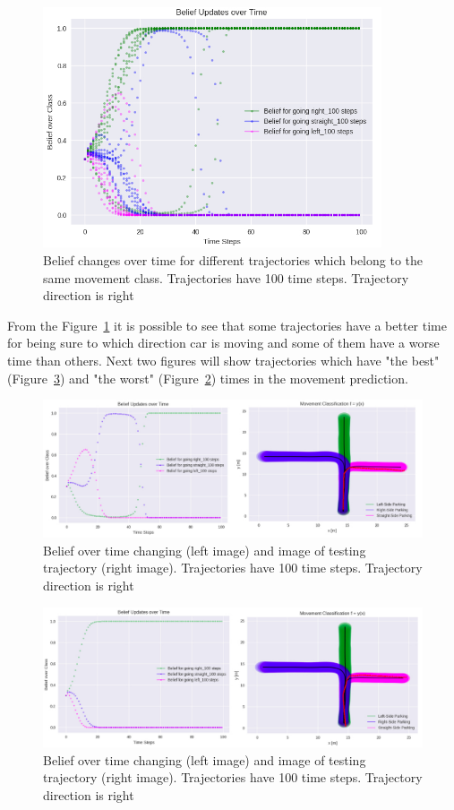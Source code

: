 \begin{figure}[h]
	\centering  	
	\includegraphics[width=10cm]{img/10_rights.jpg}
	\caption{Belief changes over time for different trajectories which belong to the same movement class. Trajectories have 100 time steps. Trajectory direction is right}
	\label{fig:10Rights}    
\end{figure}

From the Figure~\ref{fig:10Rights} it is possible to see that some trajectories have a better time for being sure to which direction car is moving and some of them have a worse time than others. Next two figures will show trajectories which have "the best" (Figure~\ref{fig:RightGood}) and "the worst" (Figure~\ref{fig:RightBad}) times in the movement prediction.

\begin{figure}[h]
	\centering  	
	\includegraphics[width=15cm]{img/bad_right_tr.jpg}
	\caption{Belief over time changing (left image) and image of testing trajectory (right image). Trajectories have 100 time steps. Trajectory direction is right}
	\label{fig:RightBad}    
\end{figure}

\begin{figure}[h]
	\centering  	
	\includegraphics[width=15cm]{img/good_right_tr.jpg}
	\caption{Belief over time changing (left image) and image of testing trajectory (right image). Trajectories have 100 time steps. Trajectory direction is right}
	\label{fig:RightGood}    
\end{figure}

